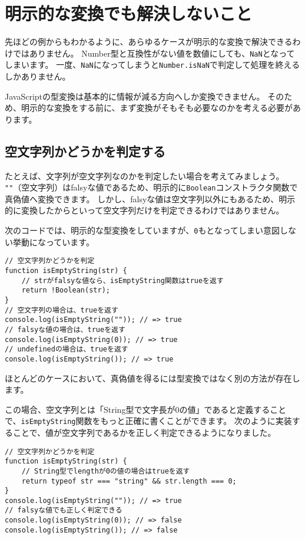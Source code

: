 \hypertarget{unsolved-problem}{%
\section{明示的な変換でも解決しないこと}\label{unsolved-problem}}

先ほどの例からもわかるように、あらゆるケースが明示的な変換で解決できるわけではありません。
Number型と互換性がない値を数値にしても、\texttt{NaN}となってしまいます。
一度、\texttt{NaN}になってしまうと\texttt{Number.isNaN}で判定して処理を終えるしかありません。

JavaScriptの型変換は基本的に情報が減る方向へしか変換できません。
そのため、明示的な変換をする前に、まず変換がそもそも必要なのかを考える必要があります。

\hypertarget{judge-empty-string}{%
\subsection{空文字列かどうかを判定する}\label{judge-empty-string}}

たとえば、文字列が空文字列なのかを判定したい場合を考えてみましょう。
\texttt{""}（空文字列）はfalsyな値であるため、明示的に\texttt{Boolean}コンストラクタ関数で真偽値へ変換できます。
しかし、falsyな値は空文字列以外にもあるため、明示的に変換したからといって空文字列だけを判定できるわけではありません。

次のコードでは、明示的な型変換をしていますが、\texttt{0}も\textbf{}となってしまい意図しない挙動になっています。

\begin{lstlisting}
// 空文字列かどうかを判定
function isEmptyString(str) {
    // strがfalsyな値なら、isEmptyString関数はtrueを返す
    return !Boolean(str);
}
// 空文字列の場合は、trueを返す
console.log(isEmptyString("")); // => true
// falsyな値の場合は、trueを返す
console.log(isEmptyString(0)); // => true
// undefinedの場合は、trueを返す
console.log(isEmptyString()); // => true
\end{lstlisting}

ほとんどのケースにおいて、真偽値を得るには型変換ではなく別の方法が存在します。

この場合、空文字列とは「String型で文字長が0の値」であると定義することで、\texttt{isEmptyString}関数をもっと正確に書くことができます。
次のように実装することで、値が空文字列であるかを正しく判定できるようになりました。

\enlargethispage{\baselineskip}\begin{lstlisting}
// 空文字列かどうかを判定
function isEmptyString(str) {
    // String型でlengthが0の値の場合はtrueを返す
    return typeof str === "string" && str.length === 0;
}
console.log(isEmptyString("")); // => true
// falsyな値でも正しく判定できる
console.log(isEmptyString(0)); // => false
console.log(isEmptyString()); // => false
\end{lstlisting}

